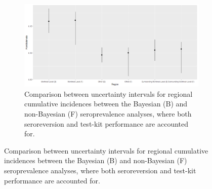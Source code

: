 \captionsetup[subfigure]{labelformat=empty}
\begin{figure}[ht!]
\centering
\begin{subfigure}[b]{\columnwidth} 
    \includegraphics[width=\columnwidth]{../../plot/intervals.png}
    \caption{Comparison between uncertainty intervals for regional cumulative incidences between the Bayesian (B) and non-Bayesian (F) seroprevalence analyses, where both seroreversion and test-kit performance are accounted for.}
    \label{fig:intervals}
\end{subfigure}
\end{figure}